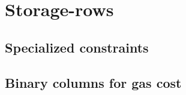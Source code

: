 \section{Storage-rows}
\subsection{Specialized constraints \lispDone{}}         \label{hub: storage: specialized constraints}    
\subsection{Binary columns for gas cost \lispDone{}}     \label{hub: storage: gas cost binary columns}    
